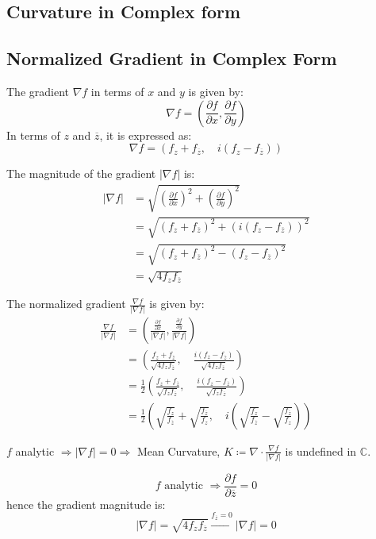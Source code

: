\subsection{Curvature in Complex form}
\subsection{Normalized Gradient in Complex Form}

The gradient $\nabla f$ in terms of $x$ and $y$ is given by:
\[ 
\nabla f = \left( \frac{\partial f}{\partial x}, \frac{\partial f}{\partial y} \right) 
\]
In terms of $z$ and $\overline{z}$, it is expressed as:
\[ 
\nabla f = \left( f_z + f_{\overline{z}}, \quad i \left( f_z - f_{\overline{z}} \right) \right) 
\]

The magnitude of the gradient $|\nabla f|$ is:
\[ 
\begin{split}
|\nabla f| &= \sqrt{\left( \frac{\partial f}{\partial x} \right)^2 + \left( \frac{\partial f}{\partial y} \right)^2} \\
&= \sqrt{\left( f_z + f_{\overline{z}} \right)^2 + \left( i \left( f_z - f_{\overline{z}} \right) \right)^2} \\
&= \sqrt{\left( f_z + f_{\overline{z}} \right)^2 - \left( f_z - f_{\overline{z}} \right)^2} \\
&= \sqrt{4 f_z f_{\overline{z}}}
\end{split}
\]

The normalized gradient $\frac{\nabla f}{|\nabla f|}$ is given by:
\[ 
\begin{split}
\frac{\nabla f}{|\nabla f|} &= \left( \frac{\frac{\partial f}{\partial x}}{|\nabla f|}, \frac{\frac{\partial f}{\partial y}}{|\nabla f|} \right) \\
&= \left( \frac{f_z + f_{\overline{z}}}{\sqrt{4 f_z f_{\overline{z}}}}, \quad \frac{i (f_z - f_{\overline{z}})}{\sqrt{4 f_z f_{\overline{z}}}} \right) \\
&= \frac{1}{2} \left( \frac{f_z + f_{\overline{z}}}{\sqrt{f_z f_{\overline{z}}}}, \quad \frac{i (f_z - f_{\overline{z}})}{\sqrt{f_z f_{\overline{z}}}} \right) \\
&= \frac{1}{2} \left( \sqrt{\frac{f_z}{f_{\overline{z}}}} + \sqrt{\frac{f_{\overline{z}}}{f_z}}, \quad i \left( \sqrt{\frac{f_z}{f_{\overline{z}}}} - \sqrt{\frac{f_{\overline{z}}}{f_z}} \right) \right)
\end{split}
\]

\begin{prop}
$f$ analytic $\Longrightarrow |\nabla f|=0\Longrightarrow$ Mean Curvature, $K\coloneqq \nabla\cdot\frac{\nabla f}{|\nabla f|}$ is undefined in $\mathbb{C}$.    
\end{prop}
\[f\text{ analytic }\Longrightarrow \frac{\partial f}{\partial \overline{z}} = 0\]
hence the gradient magnitude is:
\[ |\nabla f| = \sqrt{4 f_z f_{\overline{z}}} \xrightarrow[]{f_{\overline{z}} = 0}|\nabla f| = 0\]

